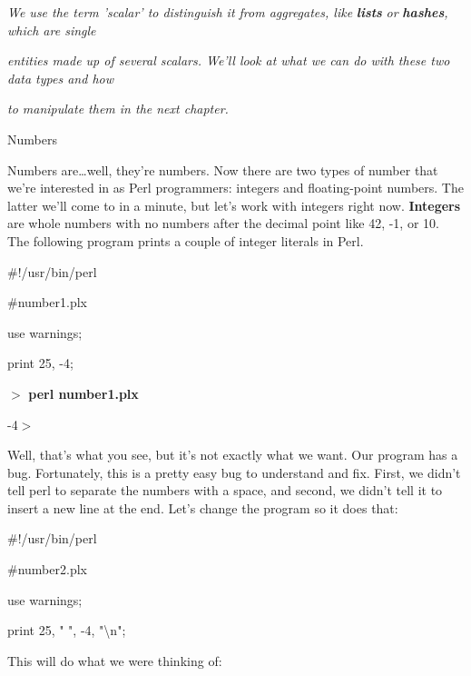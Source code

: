 \documentclass[a4paper,11pt]{book}
\begin{document}
\noindent 

\noindent \textit{We use the term 'scalar' to distinguish it from aggregates, like }\textbf{\textit{lists }}\textit{or }\textbf{\textit{hashes}}\textit{, which are single}

\noindent \textit{entities made up of several scalars. We'll look at what we can do with these two data types and how}

\noindent \textit{to manipulate them in the next chapter.}

\noindent 

\noindent 

\noindent Numbers

\noindent 

\noindent Numbers are\dots well, they're numbers. Now there are two types of number that we're interested in as Perl programmers: integers and floating-point numbers. The latter we'll come to in a minute, but let's work with integers right now. \textbf{Integers }are whole numbers with no numbers after the decimal point like 42, -1, or 10. The following program prints a couple of integer literals in Perl.

\noindent 

\noindent \#!/usr/bin/perl

\noindent \#number1.plx

\noindent use warnings;

\noindent print 25, -4;

\noindent 

\noindent $>$ \textbf{perl number1.plx}

-4$>$

\noindent 

\noindent Well, that's what you see, but it's not exactly what we want. Our program has a bug. Fortunately, this is a pretty easy bug to understand and fix. First, we didn't tell perl to separate the numbers with a space, and second, we didn't tell it to insert  a new line at the end. Let's change the program so it does that:

\noindent 

\noindent \#!/usr/bin/perl

\noindent \#number2.plx

\noindent use warnings;

\noindent print 25, " ", -4, "\textbackslash n";

\noindent 

\noindent This will do what we were thinking of:

\noindent 
\end{document}
